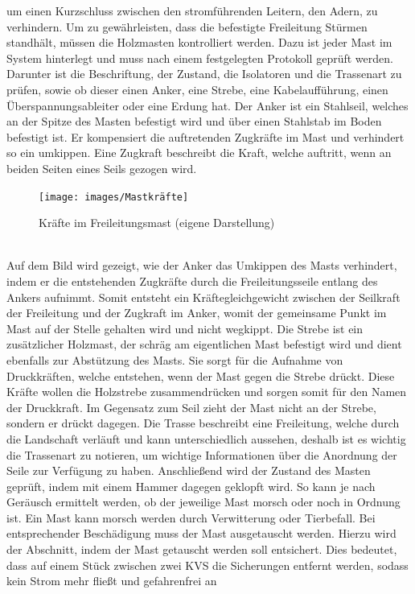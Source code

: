 um einen Kurzschluss zwischen den stromführenden Leitern, den Adern, zu verhindern. Um zu gewährleisten, dass die befestigte Freileitung Stürmen standhält,
müssen die Holzmasten kontrolliert werden. Dazu ist jeder Mast im System hinterlegt und muss nach einem festgelegten Protokoll geprüft werden. Darunter ist 
die Beschriftung, der Zustand, die Isolatoren und die Trassenart zu prüfen, sowie ob dieser einen Anker, eine Strebe, eine Kabelaufführung, einen 
Überspannungsableiter oder eine Erdung hat. Der Anker ist ein Stahlseil, welches an der Spitze des Masten befestigt wird und über einen Stahlstab im Boden 
befestigt ist. Er kompensiert die auftretenden Zugkräfte im Mast und verhindert so ein umkippen. Eine Zugkraft beschreibt die Kraft, welche auftritt, wenn 
an beiden Seiten eines Seils gezogen wird. 
\begin{figure}[hbt]
    \centering
    \texttt{[image: images/Mastkräfte]}
    \caption[Isolator]{Kräfte im Freileitungsmast (eigene Darstellung)}
    \label{fig:Kräfte im Mast}
\end{figure}
\\Auf dem Bild wird gezeigt, wie der Anker das Umkippen des Masts verhindert, indem er die entstehenden Zugkräfte durch die Freileitungsseile entlang des Ankers 
aufnimmt. Somit entsteht ein Kräftegleichgewicht zwischen der Seilkraft der Freileitung und der Zugkraft im Anker, womit der gemeinsame Punkt im Mast auf der 
Stelle gehalten wird und nicht wegkippt. Die Strebe ist ein zusätzlicher Holzmast, der schräg am eigentlichen Mast befestigt wird und dient ebenfalls zur 
Abstützung des Masts. Sie sorgt für die Aufnahme von Druckkräften, welche entstehen, wenn der Mast gegen die Strebe drückt. Diese Kräfte wollen die Holzstrebe
zusammendrücken und sorgen somit für den Namen der Druckkraft. Im Gegensatz zum Seil zieht der Mast nicht an der Strebe, sondern er drückt dagegen. Die 
Trasse beschreibt eine Freileitung, welche durch die Landschaft verläuft und kann unterschiedlich aussehen, deshalb ist es wichtig die Trassenart zu notieren,
um wichtige Informationen über die Anordnung der Seile zur Verfügung zu haben. Anschließend wird der Zustand des Masten geprüft, indem mit einem Hammer 
dagegen geklopft wird. So kann je nach Geräusch ermittelt werden, ob der jeweilige Mast morsch oder noch in Ordnung ist. Ein Mast kann morsch werden durch 
Verwitterung oder Tierbefall. Bei entsprechender Beschädigung muss der Mast ausgetauscht werden. Hierzu wird der Abschnitt, indem der Mast getauscht werden 
soll entsichert. Dies bedeutet, dass auf einem Stück zwischen zwei KVS die Sicherungen entfernt werden, sodass kein Strom mehr fließt und gefahrenfrei an 
